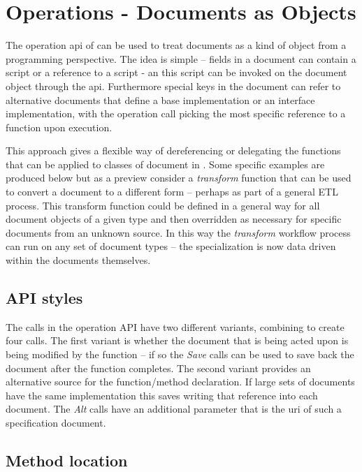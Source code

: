 \chapter{Operations - Documents as Objects}

The operation api of \Rapture can be used to treat \Rapture documents as a kind
of object from a programming perspective. The idea is simple -- fields in a \Rapture
document can contain a \Reflex script or a reference to a \Reflex script - an this
script can be invoked on the document object through the api. Furthermore special keys
in the document can refer to alternative documents that define a base implementation or
an interface implementation, with the operation call picking the most specific reference
to a function upon execution.

This approach gives a flexible way of dereferencing or delegating the functions that
can be applied to classes of document in \Rapture. Some specific examples are produced below but
as a preview consider a \emph{transform} function that can be used to convert a \Rapture document
to a different form -- perhaps as part of a general ETL process. This transform function could be
defined in a general way for all document objects of a given type and then overridden as necessary for
specific documents from an unknown source. In this way the \emph{transform} workflow process can run
on any set of document types -- the specialization is now data driven within the documents
themselves.

\section{API styles}

The calls in the operation API have two different variants, combining to create four calls. The first variant is
whether the document that is being acted upon is being modified by the function -- if so the \emph{Save} calls can
be used to save back the document after the function completes. The second variant provides an alternative source
for the function/method declaration. If large sets of documents have the same implementation this saves writing that reference
into each document. The \emph{Alt} calls have an additional parameter that is the uri of such a specification document.

\section{Method location}

